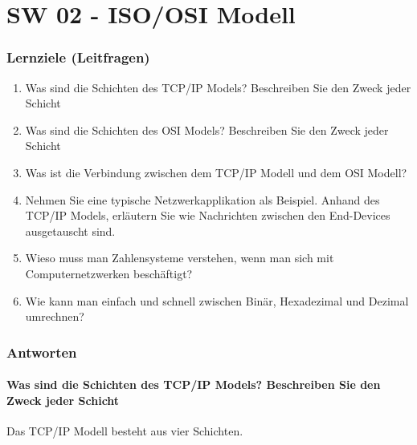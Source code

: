 \part{SW 02 - ISO/OSI Modell}
\section{Lernziele (Leitfragen)}
\begin{enumerate}
    \item Was sind die Schichten des TCP/IP Models? Beschreiben Sie den Zweck jeder Schicht
    \item Was sind die Schichten des OSI Models? Beschreiben Sie den Zweck jeder Schicht
    \item Was ist die Verbindung zwischen dem TCP/IP Modell und dem OSI Modell?
    \item Nehmen Sie eine typische Netzwerkapplikation als Beispiel. Anhand des TCP/IP Models, erläutern Sie wie Nachrichten zwischen den End-Devices ausgetauscht sind.
    \item Wieso muss man Zahlensysteme verstehen, wenn man sich mit Computernetzwerken beschäftigt?
    \item Wie kann man einfach und schnell zwischen Binär, Hexadezimal und Dezimal umrechnen?
\end{enumerate}

\section{Antworten}
\subsection*{Was sind die Schichten des TCP/IP Models? Beschreiben Sie den Zweck jeder Schicht}
Das TCP/IP Modell besteht aus vier Schichten.\\

